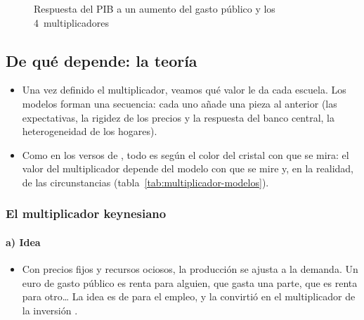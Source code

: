 \documentclass[11pt]{article}
\begin{document}
\begin{figure}[H]
\centering
\caption{Respuesta del PIB a un aumento del gasto público y los 4~multiplicadores}\label{fig:multiplicadores-irf}
\end{figure}

\subsection{De qué depende: la teoría}\label{sec:teoria-multiplicador}

\begin{itemize}
\item Una vez definido el multiplicador, veamos qué valor le da cada escuela. Los modelos forman una secuencia: cada uno añade una pieza al anterior (las expectativas, la rigidez de los precios y la respuesta del banco central, la heterogeneidad de los hogares).
\item Como en los versos de , todo es según el color del cristal con que se mira: el valor del multiplicador depende del modelo con que se mire y, en la realidad, de las circunstancias (tabla~\ref{tab:multiplicador-modelos}).
\end{itemize}

\subsubsection{El multiplicador keynesiano}\label{sec:keynesiano}

\paragraph{a) Idea}

\begin{itemize}
\item Con precios fijos y recursos ociosos, la producción se ajusta a la demanda. Un euro de gasto público es renta para alguien, que gasta una parte, que es renta para otro\ldots{} La idea es de \textcite{Kahn1931Relation} para el empleo, y \textcite[cap.~10]{Keynes1936} la convirtió en el multiplicador de la inversión .
\end{itemize}
\end{document}
